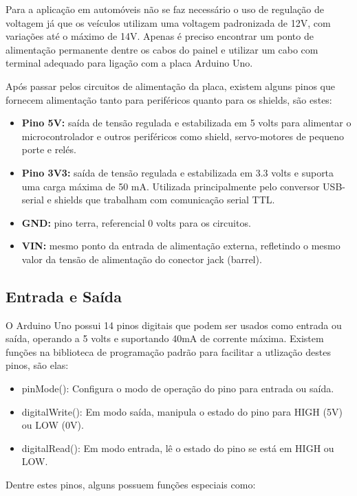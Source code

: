 Para a aplicação em automóveis não se faz necessário o uso de regulação de voltagem já que os veículos utilizam uma voltagem padronizada de 12V, com variações até o máximo de 14V. Apenas é preciso encontrar um ponto de alimentação permanente dentre os cabos do painel e utilizar um cabo com terminal adequado para ligação com a placa Arduino Uno.

Após passar pelos circuitos de alimentação da placa, existem alguns pinos que fornecem alimentação tanto para periféricos quanto para os shields, são estes:

\begin{itemize}
	\item \textbf{Pino 5V:} saída de tensão regulada e estabilizada em 5 volts para alimentar o microcontrolador e outros periféricos como shield, servo-motores de pequeno porte e relés.
	\item \textbf{Pino 3V3:} saída de tensão regulada e estabilizada em 3.3 volts e suporta uma carga máxima de 50 mA. Utilizada principalmente pelo conversor USB-serial e shields que trabalham com comunicação serial TTL.
	\item \textbf{GND:} pino terra, referencial 0 volts para os circuitos.
	\item \textbf{VIN:} mesmo ponto da entrada de alimentação externa, refletindo o mesmo valor da tensão de alimentação do conector jack (barrel).
\end{itemize}

\subsection{Entrada e Saída}

O Arduino Uno possui 14 pinos digitais que podem ser usados como entrada ou saída, operando a 5 volts e suportando 40mA de corrente máxima. Existem funções na biblioteca de programação padrão para facilitar a utlização destes pinos, são elas:

\begin{itemize}
	\item pinMode(): Configura o modo de operação do pino para entrada ou saída.
	\item digitalWrite(): Em modo saída, manipula o estado do pino para HIGH (5V) ou LOW (0V).
	\item digitalRead(): Em modo entrada, lê o estado do pino se está em HIGH ou LOW.
\end{itemize}

Dentre estes pinos, alguns possuem funções especiais como:

